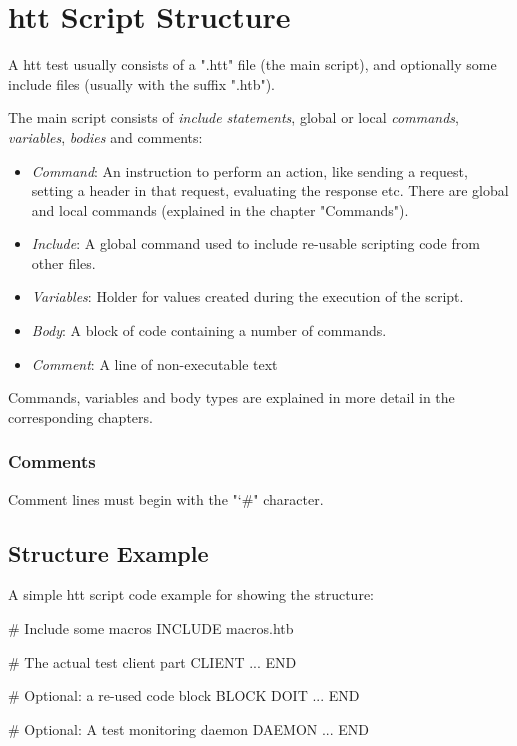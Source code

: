 \chapter{htt Script Structure}
\label{chap:structure}
\begin{flushleft}
A htt test usually consists of a ".htt" file (the main script), and optionally
some include files (usually with the suffix ".htb").

The main script consists of \textit{include statements}, global or local 
\textit{commands}, \textit{variables}, \textit{bodies} and comments:

\begin{itemize}
  \item \textit{Command}: An instruction to perform an action, like sending a request,
          setting a header in that request, evaluating the response etc. There are 
          global and local commands (explained in the chapter "Commands").
  \item \textit{Include}: A global command used to include re-usable scripting code from other files.
  \item \textit{Variables}: Holder for values created during the execution of the script. 
  \item \textit{Body}: A block of code containing a number of commands.
  \item \textit{Comment}: A line of non-executable text
\end{itemize}

Commands, variables and body types are explained in more detail in the corresponding chapters. 

\subsection{Comments}

Comment lines must begin with the "\char`\#" character.

\newpage
\section{Structure Example}

A simple htt script code example for showing the structure:
\end{flushleft}

\begin{usplisting}
    # Include some macros
    INCLUDE macros.htb
    
    # The actual test client part
    CLIENT
       ...
    END
    
    # Optional: a re-used code block
    BLOCK DOIT
       ...
    END
    
    # Optional: A test monitoring daemon
    DAEMON
       ...
    END 
\end{usplisting}

